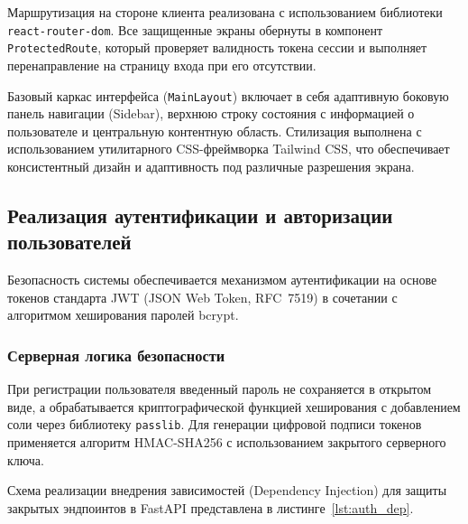 Маршрутизация на стороне клиента реализована с использованием библиотеки \texttt{react-router-dom}. Все защищенные экраны обернуты в компонент \texttt{ProtectedRoute}, который проверяет валидность токена сессии и выполняет перенаправление на страницу входа при его отсутствии.

Базовый каркас интерфейса (\texttt{MainLayout}) включает в себя адаптивную боковую панель навигации (Sidebar), верхнюю строку состояния с информацией о пользователе и центральную контентную область. Стилизация выполнена с использованием утилитарного CSS-фреймворка Tailwind CSS, что обеспечивает консистентный дизайн и адаптивность под различные разрешения экрана.

\subsection{Реализация аутентификации и авторизации пользователей}

Безопасность системы обеспечивается механизмом аутентификации на основе токенов стандарта JWT (JSON Web Token, RFC~7519) в сочетании с алгоритмом хеширования паролей bcrypt.

\subsubsection{Серверная логика безопасности}
При регистрации пользователя введенный пароль не сохраняется в открытом виде, а обрабатывается криптографической функцией хеширования с добавлением соли через библиотеку \texttt{passlib}. Для генерации цифровой подписи токенов применяется алгоритм HMAC-SHA256 с использованием закрытого серверного ключа.

Схема реализации внедрения зависимостей (Dependency Injection) для защиты закрытых эндпоинтов в FastAPI представлена в листинге~\ref{lst:auth_dep}.

